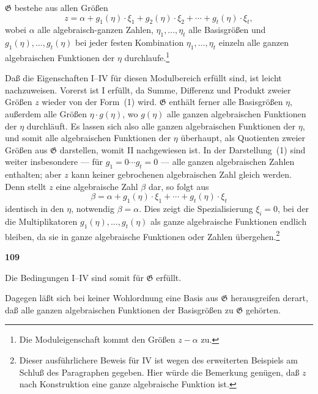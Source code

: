 \documentclass[12pt,a4paper]{article}
\begin{document}
$\mathfrak{G}$ bestehe aus allen Gr\"o\ss en
\begin{equation}\tag{1}
z = \alpha + g_1(\eta) \cdot \xi_1 + g_2(\eta) \cdot \xi_2 + \cdots + g_t(\eta) \cdot \xi_t,
\end{equation}
wobei $\alpha$ alle algebraisch-ganzen Zahlen, $\eta_1, \ldots, \eta_t$ alle Basisgr\"o\ss en und $g_1(\eta), \ldots, g_t(\eta)$ bei jeder festen Kombination $\eta_1, \ldots, \eta_t$ einzeln alle ganzen algebraischen Funktionen der $\eta$ durchlaufe.\footnote{Die Moduleigenschaft kommt den Gr\"o\ss en $z - \alpha$ zu.}

Da\ss{} die Eigenschaften I--IV f\"ur diesen Modulbereich erf\"ullt sind, ist leicht nachzuweisen. Vorerst ist I erf\"ullt, da Summe, Differenz und Produkt zweier Gr\"o\ss en $z$ wieder von der Form~(1) wird. $\mathfrak{G}$ enth\"alt ferner alle Basisgr\"o\ss en $\eta$, au\ss erdem alle Gr\"o\ss en $\eta \cdot g(\eta)$, wo $g(\eta)$ alle ganzen algebraischen Funktionen der $\eta$ durchl\"auft. Es lassen sich also alle ganzen algebraischen Funktionen der $\eta$, und somit alle algebraischen Funktionen der $\eta$ \"uberhaupt, als Quotienten zweier Gr\"o\ss en aus $\mathfrak{G}$ darstellen, womit II nachgewiesen ist. In der Darstellung~(1) sind weiter insbesondere --- f\"ur $g_1 = 0 \cdots g_t = 0$ --- alle ganzen algebraischen Zahlen enthalten; aber $z$ kann keiner gebrochenen algebraischen Zahl gleich werden. Denn stellt $z$ eine algebraische Zahl $\beta$ dar, so folgt aus
\[\beta = \alpha + g_1(\eta) \cdot \xi_1 + \cdots + g_t(\eta) \cdot \xi_t\]
identisch in den $\eta$, notwendig $\beta = \alpha$. Dies zeigt die Spezialisierung $\xi_i = 0$, bei der die Multiplikatoren $g_1(\eta), \ldots, g_t(\eta)$ als ganze algebraische Funktionen endlich bleiben, da sie in ganze algebraische Funktionen oder Zahlen \"ubergehen.\footnote{Dieser ausf\"uhrlichere Beweis f\"ur IV ist wegen des erweiterten Beispiels am Schlu\ss{} des Paragraphen gegeben. Hier w\"urde die Bemerkung gen\"ugen, da\ss{} $z$ nach Konstruktion eine ganze algebraische Funktion ist.}

\newpage
\begin{center}
\textbf{109}
\end{center}

Die Bedingungen I--IV sind somit f\"ur $\mathfrak{G}$ erf\"ullt.

Dagegen l\"a\ss t sich bei keiner Wohlordnung eine Basis aus $\mathfrak{G}$ herausgreifen derart, da\ss{} alle ganzen algebraischen Funktionen der Basisgr\"o\ss en zu $\mathfrak{G}$ geh\"orten.
\end{document}
